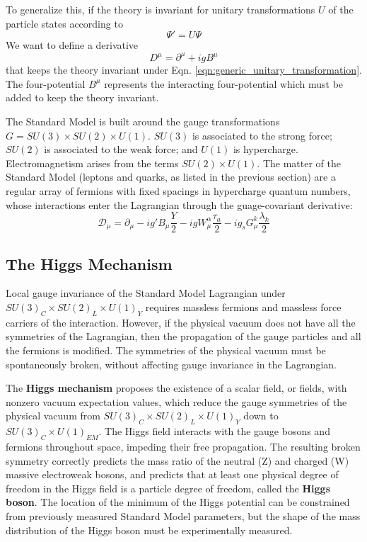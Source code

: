 \documentclass{article}
\begin{document}
To generalize this, if the theory is invariant for unitary transformations $U$ of the particle states according to 
\begin{equation}
    \Psi' = U\Psi
\label{eqn:generic_unitary_transformation}
\end{equation}
We want to define a derivative
\begin{equation}
    D^\mu = \partial^\mu + ig B^\mu
\end{equation}
that keeps the theory invariant under Eqn. \ref{eqn:generic_unitary_transformation}. The four-potential $B^\mu$ represents the interacting four-potential which must be added to keep the theory invariant.

The Standard Model is built around the gauge transformations $G = SU(3) \times SU(2) \times U(1)$. $SU(3)$ is associated to the strong force; $SU(2)$ is associated to the weak force; and $U(1)$ is hypercharge. Electromagnetism arises from the terms $SU(2) \times U(1)$. The matter of the Standard Model (leptons and quarks, as listed in the previous section) are a regular array of fermions with fixed spacings in hypercharge quantum numbers, whose interactions enter the Lagrangian through the guage-covariant derivative:
\begin{equation}
    \mathcal{D}_\mu = \partial_\mu - ig' B_\mu \frac{Y}{2} - ig W_{\mu}^{\alpha} \frac{\tau_a}{2} - ig_s G_\mu^{k} \frac{\lambda_k}{2}
\end{equation}

\subsection{The Higgs Mechanism}
Local gauge invariance of the Standard Model Lagrangian under $SU(3)_C \times SU(2)_L \times U(1)_Y$ requires massless fermions and massless force carriers of the interaction. However, if the physical vacuum does not have all the symmetries of the Lagrangian, then the propagation of the gauge particles and all the fermions is modified. The symmetries of the physical vacuum must be spontaneously broken, without affecting gauge invariance in the Lagrangian. 

The \textbf{Higgs mechanism} proposes the existence of a scalar field, or fields, with nonzero vacuum expectation values, which reduce the gauge symmetries of the physical vacuum from $SU(3)_C \times SU(2)_L \times U(1)_Y$ down to $SU(3)_C \times U(1)_{EM}$. The Higgs field interacts with the gauge bosons and fermions throughout space, impeding their free propagation. The resulting broken symmetry correctly predicts the mass ratio of the neutral (Z) and charged (W) massive electroweak bosons, and predicts that at least one physical degree of freedom in the Higgs field is a particle degree of freedom, called the \textbf{Higgs boson}. The location of the minimum of the Higgs potential can be constrained from previously measured Standard Model parameters, but the shape of the mass distribution of the Higgs boson must be experimentally measured.
\end{document}
